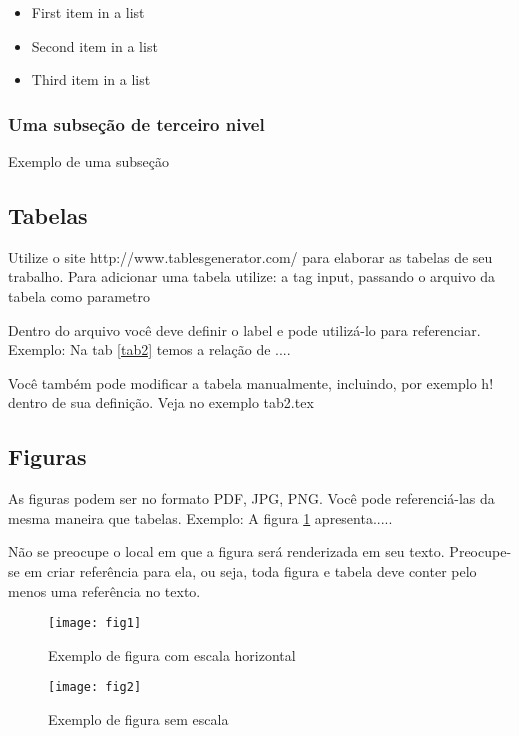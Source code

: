 \documentclass[	DIV=calc,%
paper=a4,%
fontsize=12pt,%
onecolumn]{scrartcl}	 					%
\begin{document}
	\begin{itemize}
		\item First item in a list 
		\item Second item in a list 
		\item Third item in a list
	\end{itemize}
	
	\subsubsection{Uma subseção de terceiro nivel}
	
	Exemplo de uma subseção
	
	\subsection{Tabelas}
	
	Utilize o site http://www.tablesgenerator.com/ para elaborar as tabelas de seu trabalho.
	Para adicionar uma tabela utilize: a tag input, passando o arquivo da tabela como parametro
	
	
	
	Dentro do arquivo você deve definir o label e pode utilizá-lo para referenciar. Exemplo:
	Na tab \ref{tab2} temos a relação de ....
	
	
	Você também pode modificar a tabela manualmente, incluindo, por exemplo h! dentro de sua definição. Veja no exemplo tab2.tex
	
	\subsection{Figuras}
	
	As figuras podem ser no formato PDF, JPG, PNG. Você pode referenciá-las da mesma maneira que tabelas. Exemplo: A figura \ref{fig1} apresenta.....
	
	Não se preocupe o local em que a figura será renderizada em seu texto. Preocupe-se em criar referência para ela, ou seja, toda figura e tabela deve conter pelo menos uma referência no texto.
	
	\begin{figure}
		\centering
		\texttt{[image: fig1]}
		\caption{Exemplo de figura com escala horizontal}
		\label{fig1}
	\end{figure}
	
	
	\begin{figure}
		\centering
		\texttt{[image: fig2]}
		\caption{Exemplo de figura sem escala}
		\label{fig2}
	\end{figure}
	
\end{document}
